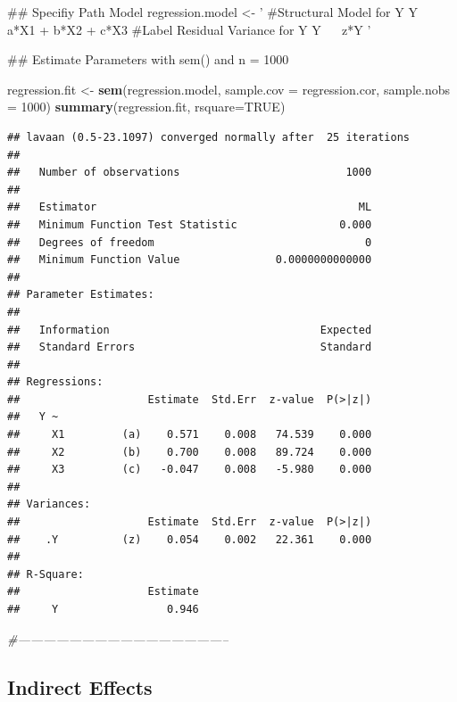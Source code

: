 \documentclass[]{book}
\newenvironment{Shaded}{\begin{snugshade}}{\end{snugshade}}
\newcommand{\KeywordTok}[1]{\textcolor[rgb]{0.13,0.29,0.53}{\textbf{#1}}}
\newcommand{\DataTypeTok}[1]{\textcolor[rgb]{0.13,0.29,0.53}{#1}}
\newcommand{\DecValTok}[1]{\textcolor[rgb]{0.00,0.00,0.81}{#1}}
\newcommand{\StringTok}[1]{\textcolor[rgb]{0.31,0.60,0.02}{#1}}
\newcommand{\CommentTok}[1]{\textcolor[rgb]{0.56,0.35,0.01}{\textit{#1}}}
\newcommand{\OtherTok}[1]{\textcolor[rgb]{0.56,0.35,0.01}{#1}}
\newcommand{\NormalTok}[1]{#1}
\theoremstyle{definition}
\theoremstyle{definition}
\theoremstyle{definition}
\theoremstyle{remark}
\begin{document}
\begin{Shaded}
\begin{Highlighting}[]
\NormalTok{## Specifiy Path Model }
\NormalTok{regression.model <-}\StringTok{ '}
\StringTok{#Structural Model for Y}
\StringTok{Y ~ a*X1 + b*X2 + c*X3}
\StringTok{#Label Residual Variance for Y }
\StringTok{Y ~~ z*Y}
\StringTok{'}

\NormalTok{## Estimate Parameters with sem() and n = 1000}

\NormalTok{regression.fit <-}\StringTok{ }\KeywordTok{sem}\NormalTok{(regression.model, }\DataTypeTok{sample.cov =}\NormalTok{ regression.cor, }\DataTypeTok{sample.nobs =} \DecValTok{1000}\NormalTok{)}
\KeywordTok{summary}\NormalTok{(regression.fit, }\DataTypeTok{rsquare=}\OtherTok{TRUE}\NormalTok{)}
\end{Highlighting}
\end{Shaded}

\begin{verbatim}
## lavaan (0.5-23.1097) converged normally after  25 iterations
## 
##   Number of observations                          1000
## 
##   Estimator                                         ML
##   Minimum Function Test Statistic                0.000
##   Degrees of freedom                                 0
##   Minimum Function Value               0.0000000000000
## 
## Parameter Estimates:
## 
##   Information                                 Expected
##   Standard Errors                             Standard
## 
## Regressions:
##                    Estimate  Std.Err  z-value  P(>|z|)
##   Y ~                                                 
##     X1         (a)    0.571    0.008   74.539    0.000
##     X2         (b)    0.700    0.008   89.724    0.000
##     X3         (c)   -0.047    0.008   -5.980    0.000
## 
## Variances:
##                    Estimate  Std.Err  z-value  P(>|z|)
##    .Y          (z)    0.054    0.002   22.361    0.000
## 
## R-Square:
##                    Estimate
##     Y                 0.946
\end{verbatim}

\begin{Shaded}
\begin{Highlighting}[]
\CommentTok{#--------------------------------------------------}
\end{Highlighting}
\end{Shaded}

\subsection{Indirect Effects}\label{indirect-effects}
\end{document}
